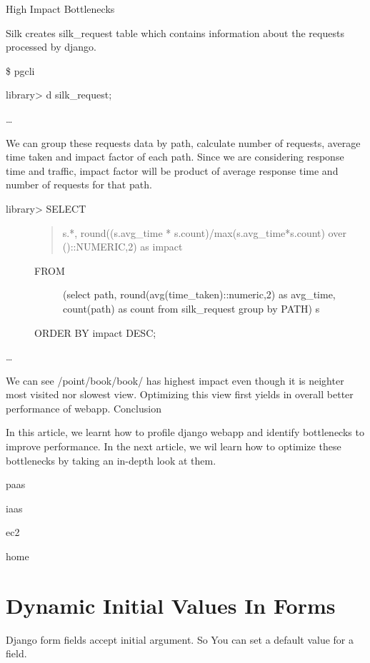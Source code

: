 \documentclass[a5paper,10pt,english]{sphinxmanual}
\begin{document}
High Impact Bottlenecks

Silk creates silk\_request table which contains information about the requests processed by django.

\$ pgcli

library\textgreater{} d silk\_request;

…

We can group these requests data by path, calculate number of requests, average time taken and impact factor of each path. Since we are considering response time and traffic, impact factor will be product of average response time and number of requests for that path.
\begin{description}
\item[{library\textgreater{} SELECT}] \leavevmode\begin{quote}

s.*, round((s.avg\_time * s.count)/max(s.avg\_time*s.count) over ()::NUMERIC,2) as impact
\end{quote}
\begin{description}
\item[{FROM}] \leavevmode
(select path, round(avg(time\_taken)::numeric,2) as avg\_time, count(path) as count from silk\_request group by PATH)
s

\end{description}

ORDER BY impact DESC;

\end{description}

…

We can see /point/book/book/ has highest impact even though it is neighter most visited nor slowest view. Optimizing this view first yields in overall better performance of webapp.
Conclusion

In this article, we learnt how to profile django webapp and identify bottlenecks to improve performance. In the next article, we wil learn how to optimize these bottlenecks by taking an in-depth look at them.

paas

iaas

ec2

home


\chapter{Dynamic Initial Values In Forms}
\label{\detokenize{misc_gotcha_initial:dynamic-initial-values-in-forms}}\label{\detokenize{misc_gotcha_initial::doc}}
Django form fields accept initial argument. So You can set a default value for a field.
\end{document}
